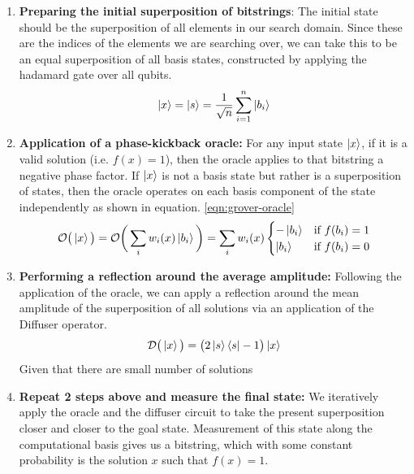\begin{enumerate}
    \item \textbf{Preparing the initial superposition of bitstrings}: The initial state should be the superposition of all elements in our search domain. Since these are the indices of the elements we are searching over, we can take this to be an equal superposition of all basis states, constructed by applying the hadamard gate over all qubits.
    \begin{equation}
        \ket{x} = \ket{s} = \frac{1}{\sqrt{n}} \sum_{i=1}^{n} \ket{b_i}
    \end{equation}

    \item \textbf{Application of a phase-kickback oracle:} For any input state $\ket{x}$, if it is a valid solution (i.e. $f(x) = 1$), then the oracle applies to that bitstring a negative phase factor. If $\ket{x}$ is not a basis state but rather is a superposition of states, then the oracle operates on each basis component of the state independently as shown in equation. \ref{eqn:grover-oracle}
    \begin{equation}\label{eqn:grover-oracle}
        \mathcal{O} \big(\ket{x} \big) = \mathcal{O}\bigg(\sum_i w_i(x) \ket{b_i} \bigg) = \sum_i w_i(x) \begin{cases}
            -\ket{b_i} & \text{if } f(b_i) = 1 \\
            \ket{b_i} & \text{if } f(b_i) = 0
        \end{cases}
    \end{equation}
    
    \item \textbf{Performing a reflection around the average amplitude:} Following the application of the oracle, we can apply a reflection around the mean amplitude of the superposition of all solutions via an application of the Diffuser operator.
    \begin{equation}
        \mathcal{D} \big(\ket{x} \big) = \big( 2 \ket{s}\bra{s} - 1 \big) \ket{x}
    \end{equation}
    Given that there are small number of solutions 
    \item \textbf{Repeat 2 steps above and measure the final state:} We iteratively apply the oracle and the diffuser circuit to take the present superposition closer and closer to the goal state. Measurement of this state along the computational basis gives us a bitstring, which with some constant probability is the solution $x$ such that $f(x) = 1$.
\end{enumerate}

